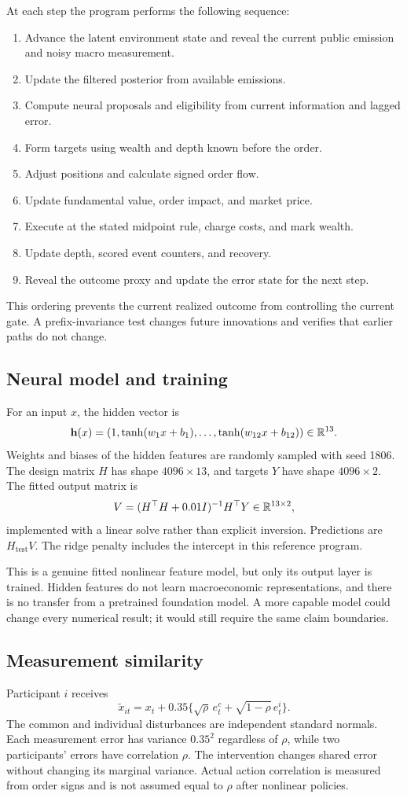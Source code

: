 At each step the program performs the following sequence:
\begin{enumerate}
\item Advance the latent environment state and reveal the current public emission and noisy macro measurement.
\item Update the filtered posterior from available emissions.
\item Compute neural proposals and eligibility from current information and lagged error.
\item Form targets using wealth and depth known before the order.
\item Adjust positions and calculate signed order flow.
\item Update fundamental value, order impact, and market price.
\item Execute at the stated midpoint rule, charge costs, and mark wealth.
\item Update depth, scored event counters, and recovery.
\item Reveal the outcome proxy and update the error state for the next step.
\end{enumerate}
This ordering prevents the current realized outcome from controlling the current gate. A prefix-invariance test changes future innovations and verifies that earlier paths do not change.

\subsection{Neural model and training}
For an input $x$, the hidden vector is
\[
\mathbf h(x)=(1,\tanh(w_1x+b_1),\ldots,\tanh(w_{12}x+b_{12}))\in\mathbb R^{13}.
\]
Weights and biases of the hidden features are randomly sampled with seed 1806. The design matrix $H$ has shape $4096\times13$, and targets $Y$ have shape $4096\times2$. The fitted output matrix is
\[
V=(H^\top H+0.01I)^{-1}H^\top Y\in\mathbb R^{13\times2},
\]
implemented with a linear solve rather than explicit inversion. Predictions are $H_{\mathrm{test}}V$. The ridge penalty includes the intercept in this reference program.

This is a genuine fitted nonlinear feature model, but only its output layer is trained. Hidden features do not learn macroeconomic representations, and there is no transfer from a pretrained foundation model. A more capable model could change every numerical result; it would still require the same claim boundaries.

\subsection{Measurement similarity}
Participant $i$ receives
\[
\widetilde x_{it}=x_t+0.35\{\sqrt\rho\,e^c_t+\sqrt{1-\rho}\,e^i_t\}.
\]
The common and individual disturbances are independent standard normals. Each measurement error has variance $0.35^2$ regardless of $\rho$, while two participants' errors have correlation $\rho$. The intervention changes shared error without changing its marginal variance. Actual action correlation is measured from order signs and is not assumed equal to $\rho$ after nonlinear policies.

